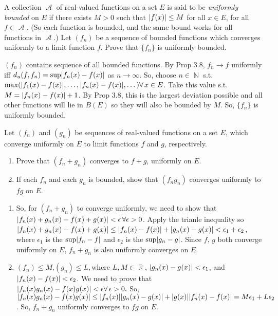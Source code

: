 \documentclass[12pt,letterpaper,boxed]{hmcpset}
\DeclareMathOperator{\A}{\mathcal{A}}
\DeclareMathOperator{\N}{\mathbb{N}}
\DeclareMathOperator{\R}{\mathbb{R}}
\DeclarePairedDelimiter\abs{\lvert}{\rvert}%
\begin{document}

\begin{problem}[Exercise 3.9]
A collection $\A$ of real-valued functions on a set $E$ is said to be \textit{uniformly bounded} on $E$ if there exists $M > 0$ such that $\abs{f(x)} \leq M$ for all $x \in E$, for all $f\in\A.$ (So each function is bounded, and the same bound works for all functions in $\A$.) Let $(f_n)$ be a sequence of bounded functions which converges uniformly to a limit function $f$. Prove that $\{f_n\}$ is uniformly bounded.
\end{problem}

\begin{solution}
$(f_n)$ contains sequence of all bounded functions. By Prop 3.8, $f_n \rightarrow f$ uniformly iff $d_u(f, f_n) = \sup \abs{f_n(x) - f(x)}$ as $n\rightarrow\infty$. So, choose $n\in\N$ s.t. $\max(\abs{f_1(x) - f(x)}, \dots, \abs{f_n(x) - f(x)}, \dots) \forall \, x \in E$. Take this value s.t. $M = \abs{f_n(x) - f(x)} + 1$. By Prop 3.8, this is the largest deviation possible and all other functions will lie in $B(E)$ so they will also be bounded by $M$. So, $\{f_n\}$ is uniformly bounded.
\end{solution}

\begin{problem}[Exercise 3.10]
Let $(f_n)$ and $(g_n)$ be sequences of real-valued functions on a set $E$, which converge uniformly on $E$ to limit functions $f$ and $g$, respectively.
\begin{enumerate}
    \item Prove that $(f_n + g_n)$ converges to $f + g$, uniformly on $E$.
    \item If each $f_n$ and each $g_n$ is bounded, show that $(f_n g_n)$ converges uniformly to $fg$ on $E$.
\end{enumerate} 
\end{problem}

\begin{solution}
\begin{enumerate}
    \item So, for $(f_n + g_n)$ to converge uniformly, we need to show that $\abs{f_n(x) + g_n(x) - f(x) + g(x)} < \epsilon\, \forall \epsilon > 0$. Apply the trianle inequality so $\abs{f_n(x) + g_n(x) - f(x) + g(x)} \leq \abs{f_n(x) - f(x)} + \abs{g_n(x) - g(x)} < \epsilon_1 + \epsilon_2$, where $\epsilon_1$ is the $\sup \abs{f_n - f}$ and $\epsilon_2$ is the $\sup \abs{g_n - g}$. Since $f$, $g$ both converge uniformly on $E$, $f_n + g_n$ is also uniformly converges on $E$.
    \item $(f_n) \leq M$,$(g_n) \leq L, $where $L, M \in \R$, $\abs{g_n(x) - g(x)} < \epsilon_1$, and $\abs{f_n(x) - f(x)} < \epsilon_2$. We need to prove that $\abs{f_n(x)g_n(x) - f(x)g(x)} < \epsilon \forall \, \epsilon > 0.$ So, $\abs{f_n(x)g_n(x) - f(x)g(x)} \leq \abs{f_n(x)}\abs{g_n(x) - g(x)} + \abs{g(x)}\abs{f_n(x) - f(x)} = M\epsilon_1 + L\epsilon_2$. So, $f_n + g_n$ uniformly converges to $fg$ on $E$.
\end{enumerate}
\end{solution}
\end{document}
